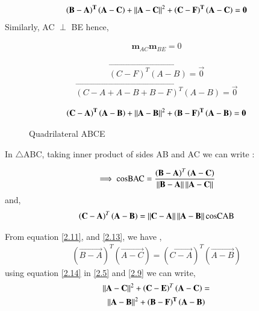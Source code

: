 \documentclass[journal,12pt,twocolumn]{IEEEtran}
\begin{document}
  \begin{align}
 \mathbf{ \left( B -  A \right)^T \left(A - C \right)} + \left\lVert\mathbf {A - C}\right\rVert^{2} + \mathbf{\left(C - F\right)^T \left(A - C \right)} = \mathbf{0} \label{2.5}
  \end{align}
Similarly, AC $\perp$ BE hence,  


 \begin{align}
 \textbf{m}_{AC} \textbf{m}_{BE} = 0
 \end{align}
 
 \begin{align}
 \vec{\left( C - F\right)^T \left(A - B \right)} =\vec{ 0}
 \end{align}
 \begin{align}
 \vec{\left( C -  A + A - B + B - F\right)^T \left(A - B \right)} = \vec{0}
 \end{align}
 
 \begin{align}
 \mathbf{ \left( C-  A \right)^T \left(A - B \right)} + \left\lVert\mathbf {A - B}\right\rVert^{2} + \mathbf{\left(B - F\right)^T \left(A - B \right)} = \mathbf{0} \label{2.9}
 \end{align}
   
\begin{figure}[!htb]
	\centering
	\resizebox{\columnwidth}{!}{}
	\caption{Quadrilateral ABCE}
\end{figure}
  
  
  
  
  

  
   In $\triangle$ABC, taking inner product of sides  AB and AC we can write :
  
 \begin{align}
\implies \text{cosBAC} = \frac{\left( \mathbf{ B - A} \right)^T  \left( \mathbf{A - C } \right)}{\left\lVert\mathbf{ B - A}\right\rVert \left\lVert\mathbf{A - C}\right\rVert} \label{2.11}
\end{align}  
  and,
   \begin{align}
  \left( \mathbf{C - A} \right)^T \left( \mathbf{A - B} \right) = \left\lVert\mathbf{C - A}\right\rVert \left\lVert\mathbf{ A - B}\right\rVert \text{cosCAB} \label{2.13}
  \end{align}
  
  From equation \ref{2.11}, and \ref{2.13}, we have ,
  \begin{multline} 
    \left( \vec{ B - A} \right)^T  \left( \vec{A - C } \right) =  \left( \vec{ C - A} \right)^T  \left( \vec{A - B } \right) \label{2.14}
   \end{multline} 
 using equation \ref{2.14} in \ref{2.5} and \ref{2.9} we can write,
   \begin{multline} 
   \left\lVert\mathbf{A - C}\right\rVert^2 + \left ( \mathbf{ C - E }\right)^T \left( \mathbf{A - C} \right)  =  \\ \left\lVert\mathbf{A - B}\right\rVert^2 + \mathbf{\left (  B - F\right)^{T} \left( A - B \right)}
    \end{multline} 
   
\end{document}
